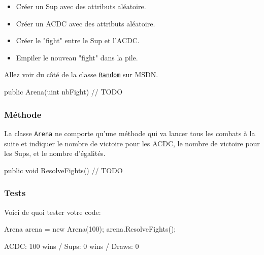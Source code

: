 \begin{itemize}
\item Créer un Sup avec des attributs aléatoire.
\item Créer un ACDC avec des attributs aléatoire.
\item Créer le "fight" entre le Sup et l'ACDC.
\item Empiler le nouveau "fight" dans la pile.
\end{itemize}

\begin{hint}
Allez voir du côté de la classe \href{https://msdn.microsoft.com/fr-fr/library/system.random(v=vs.110).aspx}{\texttt{Random}} sur MSDN.
\end{hint}

\begin{code}
public Arena(uint nbFight)
{
	// TODO
}
\end{code}

\subsubsection{Méthode}

La classe \texttt{Arena} ne comporte qu'une méthode qui va lancer tous les combats à la suite et indiquer le nombre de victoire pour les ACDC, le nombre de victoire pour les Sups, et le nombre d'égalités.

\begin{code}
public void ResolveFights()
{
	// TODO
}
\end{code}

\subsubsection{Tests}

Voici de quoi tester votre code:

\begin{code}
Arena arena = new Arena(100);
arena.ResolveFights();
\end{code}

\begin{shell}
ACDC: 100 wins / Sups: 0 wins / Draws: 0
\end{shell}